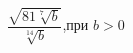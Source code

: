 \begin{ex}[type=calculate_expression]
	\begin{condition}
		\( \dfrac{\sqrt{81\sqrt[7]{b}}}{\sqrt[14]{b}} \),\quad при \( b>0 \)
	\end{condition}
\end{ex}